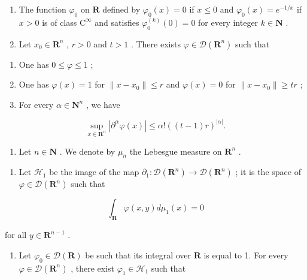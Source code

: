\exercisesection{}

\begin{enumerate}
\def\labelenumi{\arabic{enumi})}
\item
  The function \(\varphi_0\) on \(\mathbf{R}\) defined by \(\varphi_0(x) = 0\) if \(x \leqslant 0\) and \(\varphi_0(x) = e^{-1/x}\) if \(x > 0\) is of class \(\mathrm{C}^\infty\) and satisfies \(\varphi_0^{(k)}(0) = 0\) for every integer \(k \in \mathbf{N}\) .
\item
  Let \(x_0 \in \mathbf{R}^n\) , \(r > 0\) and \(t > 1\) . There exists \(\varphi \in \mathcal{D}(\mathbf{R}^n)\) such that
\end{enumerate}

\begin{enumerate}
\def\labelenumi{(\roman{enumi})}
\item
  One has \(0 \leqslant \varphi \leqslant 1\) ;
\item
  One has \(\varphi(x)=1\) for \(\|x-x_{0}\|\leqslant r\) and \(\varphi(x)=0\) for \(\|x-x_{0}\|\geqslant tr\) ;
\item
  For every \(\alpha \in \mathbf{N}^n\) , we have
\end{enumerate}

\[
\sup _ {x \in \mathbf {R} ^ {n}} | \partial^ {\alpha} \varphi (x) | \leqslant \alpha ! ((t - 1) r) ^ {| \alpha |}.
\]

\begin{enumerate}
\def\labelenumi{\arabic{enumi})}
\setcounter{enumi}{2}
\tightlist
\item
  Let \(n \in \mathbf{N}\) . We denote by \(\mu_n\) the Lebesgue measure on \(\mathbf{R}^n\) .
\end{enumerate}

\begin{enumerate}
\def\labelenumi{\alph{enumi})}
\tightlist
\item
  Let \(\mathcal{H}_1\) be the image of the map \(\partial_1\colon \mathcal{D}(\mathbf{R}^n)\to \mathcal{D}(\mathbf{R}^n)\) ; it is the space of \(\varphi \in \mathcal{D}(\mathbf{R}^n)\) such that
\end{enumerate}

\[
\int_ {\mathbf {R}} \varphi (x, y) d \mu_ {1} (x) = 0
\]

for all \(y \in \mathbf{R}^{n-1}\) .

\begin{enumerate}
\def\labelenumi{\alph{enumi})}
\setcounter{enumi}{1}
\tightlist
\item
  Let \(\varphi_0\in \mathcal{D}(\mathbf{R})\) be such that its integral over \(\mathbf{R}\) is equal to 1. For every \(\varphi \in \mathcal{D}(\mathbf{R}^n)\) , there exist \(\varphi_{1}\in \mathcal{H}_{1}\) such that
\end{enumerate}

